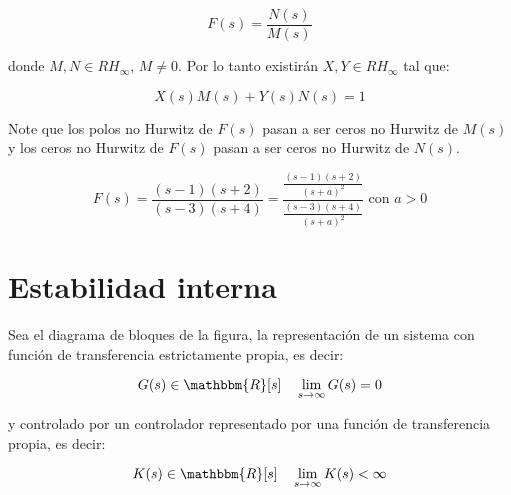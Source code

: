         \begin{equation*}
            F(s) = \frac{N(s)}{M(s)}
        \end{equation*}

        donde $M, N \in RH_{\infty}$, $M \ne 0$.
        Por lo tanto existirán $X, Y \in RH_{\infty}$ tal que:

        \begin{equation}
            X(s) M(s) + Y(s) N(s) = 1
        \end{equation}

        Note que los polos no Hurwitz de $F(s)$ pasan a ser ceros no Hurwitz de $M(s)$ y los ceros no Hurwitz de $F(s)$ pasan a ser ceros no Hurwitz de $N(s)$.

        \begin{equation*}
            F(s) = \frac{(s-1)(s+2)}{(s-3)(s+4)} = \frac{\frac{(s-1)(s+2)}{(s+a)^2}}{\frac{(s-3)(s+4)}{(s+a)^2}} \text{ con } a > 0
        \end{equation*}


    \section{Estabilidad interna}

        Sea el diagrama de bloques de la figura, la representación de un sistema con función de transferencia estrictamente propia, es decir:

        \begin{equation*}
            G(s) \in \mathbbm{R}[s] \quad \lim_{s \to \infty} G(s) = 0
        \end{equation*}

        y controlado por un controlador representado por una función de transferencia propia, es decir:

        \begin{equation*}
            K(s) \in \mathbbm{R}[s] \quad \lim_{s \to \infty} K(s) < \infty
        \end{equation*}

